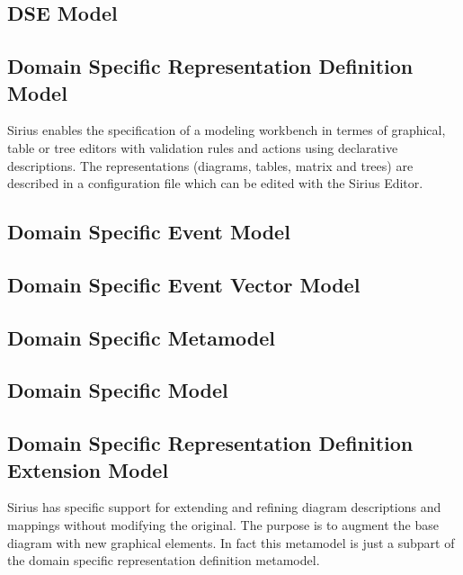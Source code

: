 \documentclass{gemoc} %
\begin{document}

\subsection{DSE Model}


\subsection{Domain Specific  Representation Definition Model}
Sirius enables the specification of a modeling workbench in termes of graphical, table or tree editors with validation rules and actions using declarative descriptions. The representations (diagrams, tables, matrix and trees) are described in a configuration file which can be edited with the Sirius Editor.

\subsection{Domain Specific Event Model}


\subsection{Domain Specific Event Vector Model}


\subsection{Domain Specific Metamodel}


\subsection{Domain Specific Model}


\subsection{Domain Specific Representation Definition Extension Model}
Sirius has specific support for extending and refining diagram descriptions and mappings without modifying the original. The purpose is to augment the base diagram with new graphical elements. In fact this metamodel is just a subpart of the domain specific representation definition metamodel.
\end{document}
